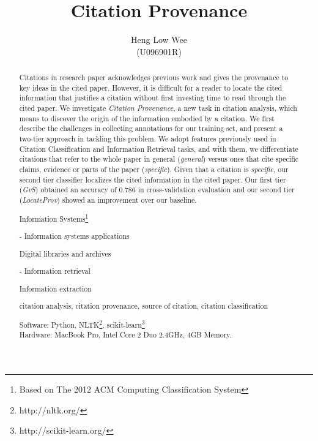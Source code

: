 \documentclass[hyp, 12pt]{socreport}
\begin{document}
\title{Citation Provenance}
\author{Heng Low Wee \\ (U096901R)}
\maketitle
\begin{abstract}
Citations in research paper acknowledges previous work and gives the provenance to key ideas in the cited paper. However, it is difficult for a reader to locate the cited information that justifies a citation without first investing time to read through the cited paper. We investigate {\it Citation Provenance}, a new task in citation analysis, which means to discover the origin of the information embodied by a citation. We first describe the challenges in collecting annotations for our training set, and present a two-tier approach in tackling this problem. We adopt features previously used in Citation Classification and Information Retrieval tasks, and with them, we differentiate citations that refer to the whole paper in general ({\it general}) versus ones that cite specific claims, evidence or parts of the paper ({\it specific}).  Given that a citation is {\it specific}, our second tier classifier localizes the cited information in the cited paper. Our first tier ({\it GvS}) obtained an accuracy of $0.786$ in cross-validation evaluation and our second tier ({\it LocateProv}) showed an improvement over our baseline. 

\begin{descriptors}
	\item Information Systems\footnote{Based on The 2012 ACM Computing Classification System}
	{\setlength\itemindent{30pt} \item - Information systems applications}
	{\setlength\itemindent{50pt} \item Digital libraries and archives}
	{\setlength\itemindent{30pt} \item - Information retrieval}
	{\setlength\itemindent{50pt} \item Information extraction}
\end{descriptors}
\begin{keywords}
	citation analysis, citation provenance, source of citation, citation classification
\end{keywords}
\begin{implement}
\begin{flushleft}
\hspace{5 mm}Software: Python, NLTK\footnote{http://nltk.org/}, scikit-learn\footnote{http://scikit-learn.org/} \nocite{scikit-learn}\\
\hspace{5 mm}Hardware: MacBook Pro, Intel Core 2 Duo 2.4GHz, 4GB Memory.
\end{flushleft}
\end{implement}
\end{abstract}
\end{document}

